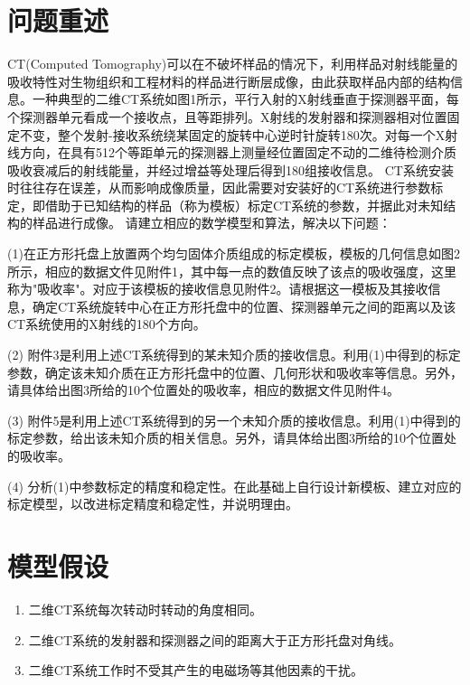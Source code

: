 \documentclass[bwprint]{cumcmthesis}
\begin{document}
\section{问题重述}
CT(Computed Tomography)可以在不破坏样品的情况下，利用样品对射线能量的吸收特性对生物组织和工程材料的样品进行断层成像，由此获取样品内部的结构信息。一种典型的二维CT系统如图1所示，平行入射的X射线垂直于探测器平面，每个探测器单元看成一个接收点，且等距排列。X射线的发射器和探测器相对位置固定不变，整个发射-接收系统绕某固定的旋转中心逆时针旋转180次。对每一个X射线方向，在具有512个等距单元的探测器上测量经位置固定不动的二维待检测介质吸收衰减后的射线能量，并经过增益等处理后得到180组接收信息。
CT系统安装时往往存在误差，从而影响成像质量，因此需要对安装好的CT系统进行参数标定，即借助于已知结构的样品（称为模板）标定CT系统的参数，并据此对未知结构的样品进行成像。
请建立相应的数学模型和算法，解决以下问题：
\begin{description}
\item (1)在正方形托盘上放置两个均匀固体介质组成的标定模板，模板的几何信息如图2所示，相应的数据文件见附件1，其中每一点的数值反映了该点的吸收强度，这里称为"吸收率"。对应于该模板的接收信息见附件2。请根据这一模板及其接收信息，确定CT系统旋转中心在正方形托盘中的位置、探测器单元之间的距离以及该CT系统使用的X射线的180个方向。
\item (2) 附件3是利用上述CT系统得到的某未知介质的接收信息。利用(1)中得到的标定参数，确定该未知介质在正方形托盘中的位置、几何形状和吸收率等信息。另外，请具体给出图3所给的10个位置处的吸收率，相应的数据文件见附件4。
\item (3) 附件5是利用上述CT系统得到的另一个未知介质的接收信息。利用(1)中得到的标定参数，给出该未知介质的相关信息。另外，请具体给出图3所给的10个位置处的吸收率。
\item (4) 分析(1)中参数标定的精度和稳定性。在此基础上自行设计新模板、建立对应的标定模型，以改进标定精度和稳定性，并说明理由。
\end{description}


\section{模型假设}
\begin{enumerate}
	\item 二维CT系统每次转动时转动的角度相同。
	\item 二维CT系统的发射器和探测器之间的距离大于正方形托盘对角线。
	\item 二维CT系统工作时不受其产生的电磁场等其他因素的干扰。
\end{enumerate}
\end{document}
